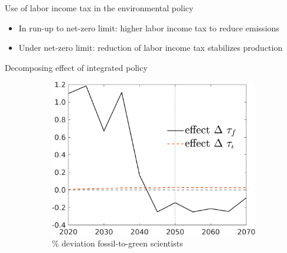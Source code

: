 \documentclass[11pt,aspectratio=169]{beamer}
\begin{document}
\begin{frame}{Use of labor income tax in the environmental policy}
\begin{figure}[h!!]
\begin{subfigure}{0.45\textwidth}
			\end{subfigure}
		\end{figure}
		\vspace{3mm}
		\begin{block}{}
			\begin{itemize}
				\item In run-up to net-zero limit: higher labor income tax to reduce emissions
				\item Under net-zero limit: reduction of labor income tax stabilizes production
			\end{itemize}
		\end{block}	
	\end{frame}
	
	\begin{frame}{Decomposing effect of integrated policy }
		\pause
		\hypertarget{mec0}{}
		\vspace{-3mm}
		\centering
		\begin{figure}
			\begin{subfigure}{0.45\textwidth}
				\caption{{\% deviation fossil-to-green scientists }}
				\includegraphics[width=1\textwidth]{../codding_model/own_basedOnFried/optimalPol_010922_revision/figures/all_13Sept22/NewCalib_polTaulFixedTaufJointPer_sffsg_Sun2_emnet1_spillover0_knspil3_xgr0_nsk0_sep0_extern0_PV1_etaa0.79_lgd1.png}
			\end{subfigure}
			\begin{minipage}[]{0.05\textwidth}
				\
			\end{minipage}
			\begin{subfigure}{0.45\textwidth}

\end{subfigure}
\end{figure}
\end{frame}
\end{document}
